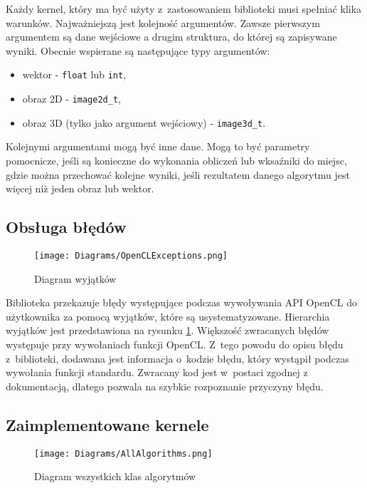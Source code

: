 Każdy kernel, który ma być użyty z~zastosowaniem biblioteki musi spełniać klika warunków. Najważniejszą jest kolejność argumentów. Zawsze pierwszym argumentem są dane wejściowe a drugim struktura, do której są zapisywane wyniki. Obecnie wspierane są następujące typy argumentów:
\begin{itemize}
\item wektor - \texttt{float\*} lub \texttt{int\*},
\item obraz 2D - \texttt{image2d\_t},
\item obraz 3D (tylko jako argument wejściowy) - \texttt{image3d\_t}.
\end{itemize}
Kolejnymi argumentami mogą być inne dane. Mogą to być parametry pomocnicze, jeśli są konieczne do wykonania obliczeń lub wksaźniki do miejsc, gdzie można przechować kolejne wyniki, jeśli rezultatem danego algorytmu jest więcej niż jeden obraz lub wektor.

\subsection{Obsługa błędów}
\label{subsec:obslugabledow}


\begin{figure}
\begin{center}
\texttt{[image: Diagrams/OpenCLExceptions.png]}
\end{center}
\caption{Diagram wyjątków}
\label{fig:diagramwyjatkow}
\end{figure}

Biblioteka przekazuje błędy występujące podczas wywoływania API OpenCL do użytkownika za pomocą wyjątków, które są usystematyzowane. Hierarchia wyjątków jest przedstawiona na rysunku \ref{fig:diagramwyjatkow}. Większość zwracanych błędów występuje przy wywołaniach funkcji OpenCL. Z~tego powodu do opisu błędu z~biblioteki, dodawana jest informacja o~kodzie błędu, który wystąpił podczas wywołania funkcji standardu. Zwracany kod jest w~postaci zgodnej z dokumentacją, dlatego pozwala na szybkie rozpoznanie przyczyny błędu.

\subsection{Zaimplementowane kernele}
\label{subsec:kernele}


\begin{figure}
\begin{center}
\texttt{[image: Diagrams/AllAlgorithms.png]}
\end{center}
\caption{Diagram wszystkich klas algorytmów}
\label{fig:diagramWszystko}
\end{figure}

